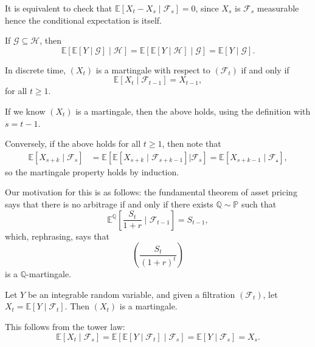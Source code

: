 \documentclass[12pt]{article}
\begin{document}
It is equivalent to check that $\mathbb{E}[X_t - X_s \mid \mathcal{F}_s] = 0$, since $X_s$ is $\mathcal{F}_s$ measurable hence the conditional expectation is itself.

\begin{proposition}
	If $\mathcal{G} \subseteq \mathcal{H}$, then
	\[
	\mathbb{E}[\mathbb{E}[Y\mid\mathcal{G}]\mid\mathcal{H}] = \mathbb{E}[\mathbb{E}[Y \mid \mathcal{H}] \mid \mathcal{G}] = \mathbb{E}[Y \mid \mathcal{G}].
	\]
\end{proposition}

\begin{proposition}
	In discrete time, $(X_t)$ is a martingale with respect to $(\mathcal{F}_t)$ if and only if
	\[
	\mathbb{E}[X_t \mid \mathcal{F}_{t-1}] = X_{t-1},
	\]
	for all $t \geq 1$.
\end{proposition}

\begin{proofbox}
	If we know $(X_t)$ is a martingale, then the above holds, using the definition with $s = t - 1$.

	Conversely, if the above holds for all $t \geq 1$, then note that
	\begin{align*}
		\mathbb{E}[X_{s+k}\mid\mathcal{F}_s] &= \mathbb{E}[\mathbb{E}[X_{s + k} \mid \mathcal{F}_{s + k - 1}] | \mathcal{F}_s] = \mathbb{E}[X_{s + k - 1} \mid \mathcal{F_s}],
	\end{align*}
	so the martingale property holds by induction.
\end{proofbox}

Our motivation for this is as follows: the fundamental theorem of asset pricing says that there is no arbitrage if and only if there exists $\mathbb{Q} \sim \mathbb{P}$ such that
\[
\mathbb{E}^{\mathbb{Q}}\left[ \frac{S_t}{1+r} \mid \mathcal{F}_{t-1} \right] = S_{t-1},
\]
which, rephrasing, says that
\[
\left( \frac{S_t}{(1 + r)^t} \right)
\]
is a $\mathbb{Q}$-martingale.

\begin{exbox}
	Let $Y$ be an integrable random variable, and given a filtration $(\mathcal{F}_t)$, let $X_t = \mathbb{E}[Y \mid \mathcal{F}_t]$. Then $(X_t)$ is a martingale.

	This follows from the tower law:
	\[
		\mathbb{E}[X_t \mid \mathcal{F}_s] = \mathbb{E}[\mathbb{E}[Y \mid \mathcal{F}_t] \mid \mathcal{F}_s] = \mathbb{E}[Y \mid \mathcal{F}_s] = X_s.
	\]
\end{exbox}

\end{document}
